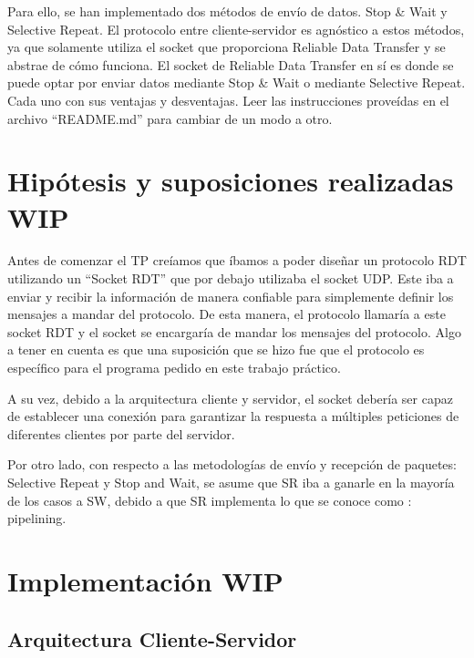 \documentclass{article}
\begin{document}
Para ello, se han implementado dos métodos de envío de datos. Stop \&
Wait y Selective Repeat. El protocolo entre cliente-servidor es
agnóstico a estos métodos, ya que solamente utiliza el socket que
proporciona Reliable Data Transfer y se abstrae de cómo funciona. El
socket de Reliable Data Transfer en sí es donde se puede optar por
enviar datos mediante Stop \& Wait o mediante Selective Repeat. Cada uno
con sus ventajas y desventajas. Leer las instrucciones proveídas en el
archivo ``README.md'' para cambiar de un modo a otro.

\section{\texorpdfstring{\textbf{Hipótesis y suposiciones realizadas
WIP}}{Hipótesis y suposiciones realizadas}}\label{hipuxf3tesis-y-suposiciones-realizadas-wip}

Antes de comenzar el TP creíamos que íbamos a poder diseñar un protocolo RDT utilizando un ``Socket RDT'' que por debajo utilizaba el socket UDP. Este iba a enviar y recibir la información de manera confiable para simplemente definir los mensajes a mandar del protocolo. De esta manera, el protocolo llamaría a este socket RDT y el socket se encargaría de mandar los mensajes del protocolo. Algo a tener en cuenta es que una suposición que se hizo fue que el protocolo es específico para el programa pedido en este trabajo práctico.

A su vez, debido a la arquitectura cliente y servidor, el socket debería ser capaz de establecer una conexión para garantizar la respuesta a múltiples peticiones de diferentes clientes por parte del servidor.

Por otro lado, con respecto a las metodologías de envío y recepción de paquetes: Selective Repeat y Stop and Wait, se asume que SR iba a ganarle en la mayoría de los casos a SW, debido a que SR implementa lo que se conoce como : pipelining.

\section{\texorpdfstring{\textbf{Implementación
WIP}}{Implementación}}\label{implementaciuxf3n-wip}

\subsection{Arquitectura Cliente-Servidor}\label{arquitectura-cliente-servidor}
\end{document}
